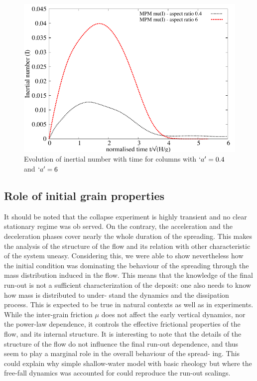 \begin{figure}[tbhp]
\centering
\includegraphics[width=\textwidth]{muI}
\caption{Evolution of inertial number with time for columns with $`a'=0.4$ and 
$`a'=6$}
\label{fig:muI}
\end{figure}

\subsection{Role of initial grain properties}

It should be noted that the collapse experiment is
highly transient and no clear stationary regime was ob
served. On the contrary, the acceleration and the deceleration 
phases cover 
nearly the whole duration of the
spreading. This makes the analysis of the structure of
the flow and its relation with other characteristic of the
system uneasy.
Considering this, we were able to show nevertheless
how the initial condition was dominating the behaviour
of the spreading through the mass distribution induced
in the flow. This means that the knowledge of the final
run-out is not a sufficient characterization of the deposit:
one also needs to know how mass is distributed to under-
stand the dynamics and the dissipation process. This is
expected to be true in natural contexts as well as in
experiments.
While the inter-grain friction
$\mu$
does not affect the early vertical dynamics, nor the power-law dependence,
it controls the effective frictional properties of the flow,
and its internal structure. It is interesting to note that
the details of the structure of the flow do not influence
the final run-out dependence, and thus seem to play a
marginal role in the overall behaviour of the spread-
ing. This could explain why simple shallow-water model
with basic rheology but where the free-fall dynamics was
accounted for could reproduce the run-out scalings.

